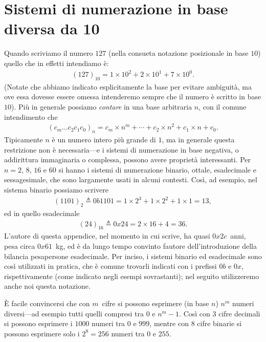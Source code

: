 \section{Sistemi di numerazione in base diversa da 10}

Quando scriviamo il numero $127$ (nella consueta notazione posizionale in base
$10$) quello che in effetti intendiamo è:
\begin{align*}
  (127)_{10} = 1 \times 10^2 + 2 \times 10^1 + 7 \times 10^0.
\end{align*}
(Notate che abbiamo indicato esplicitamente la base per evitare ambiguità, ma
ove essa dovesse essere omessa intenderemo sempre che il numero è scritto in
base $10$). Più in generale possiamo \emph{contare} in una base arbitraria
$n$, con il comune intendimento che
\begin{align}\label{eq:numero_base_arbitraria}
  (c_m\ldots c_2c_1c_0)_n = c_m \times n^m + \cdots + c_2 \times n^2 +
  c_1 \times n + c_0.
\end{align}
Tipicamente $n$ è un numero intero più grande di $1$, ma in generale questa
restrizione non è necessaria---e i sistemi di numerazione in base negativa, o
addirittura immaginaria o complessa, possono avere proprietà interessanti.
Per $n = 2$, $8$, $16$ e $60$ si hanno i sistemi di numerazione binario, ottale,
esadecimale e sessagesimale, che sono largamente usati in alcuni contesti.
Così, ad esempio, nel sistema binario possiamo scrivere
\begin{align*}
  (1101)_2 \triangleq 0b1101 =
  1 \times 2^3 + 1 \times 2^2 + 1 \times 1 = 13,
\end{align*}
ed in quello esadecimale
\begin{align*}
  (24)_{16} \triangleq 0x24 =
  2 \times 16 + 4 = 36.
\end{align*}
L'autore di questa appendice, nel momento in cui scrive, ha quasi $0x2c$~anni,
pesa circa $0x61$~kg, ed è da lungo tempo convinto fautore dell'introduzione
della bilancia pesapersone esadecimale. Per inciso, i sistemi binario ed
esadecimale sono così utilizzati in pratica, che è comune trovarli indicati
con i prefissi $0b$ e $0x$, rispettivamente (come indicato negli esempi
sovrastanti); nel seguito utilizzeremo anche noi questa notazione.

\`E facile convincersi che con $m$~cifre si possono esprimere (in base $n$)
$n^m$ numeri diversi---ad esempio tutti quelli compresi tra $0$ e $n^m - 1$.
Così con $3$ cifre decimali si possono esprimere i $1000$ numeri tra $0$ e
$999$, mentre con $8$ cifre binarie si possono esprimere solo i $2^8 = 256$
numeri tra $0$ e $255$.


